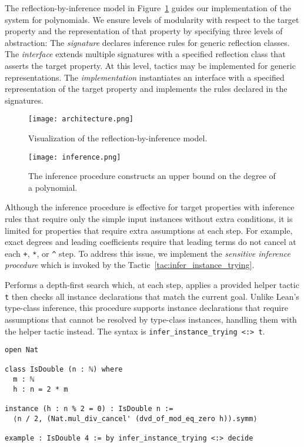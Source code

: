 
The reflection-by-inference model in Figure~\ref{fig:model} guides our implementation of the system for polynomials. We ensure levels of modularity with respect to the target property and the representation of that property by specifying three levels of abstraction: The \emph{signature} declares inference rules for generic reflection classes. The \emph{interface} extends multiple signatures with a specified reflection class that asserts the target property. At this level, tactics may be implemented for generic representations. The \emph{implementation} instantiates an interface with a specified representation of the target property and implements the rules declared in the signatures.

\begin{figure}
\centering
\caption{Visualization of the reflection-by-inference model.}
\label{fig:model}
\texttt{[image: architecture.png]}
\end{figure}

\begin{figure}
\centering
\caption{The inference procedure constructs an upper bound on the degree of a polynomial.}
\label{fig:inference}
\texttt{[image: inference.png]}
\end{figure}

\label{sec:sensitive}

Although the inference procedure is effective for target properties with inference rules that require only the simple input instances without extra conditions, it is limited for properties that require extra assumptions at each step. For example, exact degrees and leading coefficients require that leading terms do not cancel at each \lstinline{+}, \lstinline{*}, or \lstinline{^} step. To address this issue, we implement the \emph{sensitive inference procedure} which is invoked by the Tactic~\ref{tac:infer_instance_trying}.

\begin{tactic}
\label{tac:infer_instance_trying}
\leanok
Performs a depth-first search which, at each step, applies a provided helper tactic \lstinline{t} then checks all instance declarations that match the current goal. Unlike Lean's type-class inference, this procedure supports instance declarations that require assumptions that cannot be resolved by type-class instances, handling them with the helper tactic instead. The syntax is \lstinline{infer_instance_trying <:> t}.
\begin{lstlisting}
open Nat

class IsDouble (n : ℕ) where
  m : ℕ
  h : n = 2 * m

instance (h : n % 2 = 0) : IsDouble n :=
  ⟨n / 2, (Nat.mul_div_cancel' (dvd_of_mod_eq_zero h)).symm⟩

example : IsDouble 4 := by infer_instance_trying <:> decide
\end{lstlisting}
\end{tactic}

